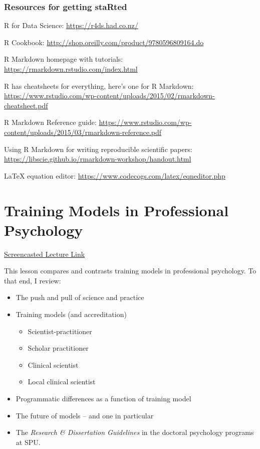 \documentclass[
  english,
]{book}
\providecommand{\tightlist}{%
  \setlength{\itemsep}{0pt}\setlength{\parskip}{0pt}}
\begin{document}
\hypertarget{resources-for-getting-started}{%
\subsection{Resources for getting staRted}\label{resources-for-getting-started}}

R for Data Science: \url{https://r4ds.had.co.nz/}

R Cookbook: \url{http://shop.oreilly.com/product/9780596809164.do}

R Markdown homepage with tutorials: \url{https://rmarkdown.rstudio.com/index.html}

R has cheatsheets for everything, here's one for R Markdown: \url{https://www.rstudio.com/wp-content/uploads/2015/02/rmarkdown-cheatsheet.pdf}

R Markdown Reference guide: \url{https://www.rstudio.com/wp-content/uploads/2015/03/rmarkdown-reference.pdf}

Using R Markdown for writing reproducible scientific papers: \url{https://libscie.github.io/rmarkdown-workshop/handout.html}

LaTeX equation editor: \url{https://www.codecogs.com/latex/eqneditor.php}

\hypertarget{TrainMod}{%
\chapter{Training Models in Professional Psychology}\label{TrainMod}}

\href{HTTPS://SPU.HOSTED.PANOPTO.COM/PANOPTO/PAGES/VIEWER.ASPX?PID=CC70F027-CDA5-4D3B-B000-AC33000B49B5}{Screencasted Lecture Link}

This lesson compares and contrasts training models in professional psychology. To that end, I review:

\begin{itemize}
\tightlist
\item
  The push and pull of science and practice
\item
  Training models (and accreditation)

  \begin{itemize}
  \tightlist
  \item
    Scientist-practitioner
  \item
    Scholar practitioner
  \item
    Clinical scientist
  \item
    Local clinical scientist
  \end{itemize}
\item
  Programmatic differences as a function of training model
\item
  The future of models -- and one in particular
\item
  The \emph{Research \& Dissertation Guidelines} in the doctoral psychology programs at SPU.
\end{itemize}
\end{document}
